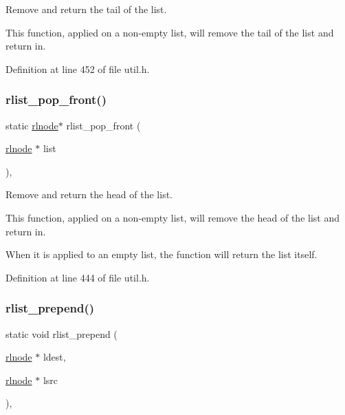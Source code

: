 Remove and return the tail of the list. 

This function, applied on a non-\/empty list, will remove the tail of the list and return in. 

Definition at line 452 of file util.\+h.

\mbox{\label{group__rlists_ga5cc2be48f94a7573fb8952356c6ba7d1}} 
\subsubsection{\texorpdfstring{rlist\+\_\+pop\+\_\+front()}{rlist\_pop\_front()}}
{\footnotesize\ttfamily static \hyperlink{group__rlists_ga8f6244877f7ce2322c90525217ea6e7a}{rlnode}$\ast$ rlist\+\_\+pop\+\_\+front (\begin{DoxyParamCaption}\item[{\hyperlink{group__rlists_ga8f6244877f7ce2322c90525217ea6e7a}{rlnode} $\ast$}]{list }\end{DoxyParamCaption})\hspace{0.3cm}{\ttfamily [inline]}, {\ttfamily [static]}}



Remove and return the head of the list. 

This function, applied on a non-\/empty list, will remove the head of the list and return in.

When it is applied to an empty list, the function will return the list itself. 

Definition at line 444 of file util.\+h.

\mbox{\label{group__rlists_ga906dea2f5a25116f979ba6585266453e}} 
\subsubsection{\texorpdfstring{rlist\+\_\+prepend()}{rlist\_prepend()}}
{\footnotesize\ttfamily static void rlist\+\_\+prepend (\begin{DoxyParamCaption}\item[{\hyperlink{group__rlists_ga8f6244877f7ce2322c90525217ea6e7a}{rlnode} $\ast$}]{ldest,  }\item[{\hyperlink{group__rlists_ga8f6244877f7ce2322c90525217ea6e7a}{rlnode} $\ast$}]{lsrc }\end{DoxyParamCaption})\hspace{0.3cm}{\ttfamily [inline]}, {\ttfamily [static]}}



